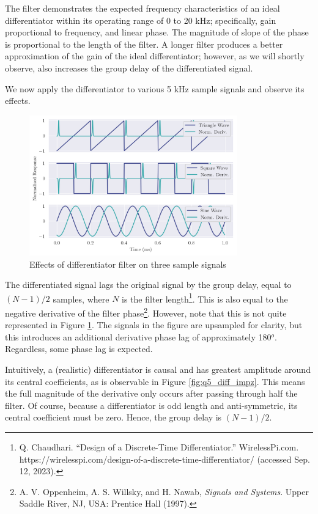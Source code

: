 The filter demonstrates the expected frequency characteristics of an ideal differentiator within its operating range of 0 to 20 kHz; specifically, gain proportional to frequency, and linear phase. The magnitude of slope of the phase is proportional to the length of the filter. A longer filter produces a better approximation of the gain of the ideal differentiator; however, as we will shortly observe, also increases the group delay of the differentiated signal.

\newpage

We now apply the differentiator to various 5 kHz sample signals and observe its effects.

\begin{figure}[!ht]
    \centering
    \includegraphics[width=0.8\textwidth]{images/q5_diff_applied.png}
    \caption{Effects of differentiator filter on three sample signals}
    \label{fig:q5_diff_applied}
\end{figure}

The differentiated signal lags the original signal by the group delay, equal to $(N-1)/2$ samples, where $N$ is the filter length\footnote{Q. Chaudhari. ``Design of a Discrete-Time Differentiator.'' WirelessPi.com. https://wirelesspi.com/design-of-a-discrete-time-differentiator/ (accessed Sep. 12, 2023).}. This is also equal to the negative derivative of the filter phase\footnote{A. V. Oppenheim, A. S. Willsky, and H. Nawab, \textit{Signals and Systems}. Upper Saddle River, NJ, USA: Prentice Hall (1997).}. However, note that this is not quite represented in Figure \ref{fig:q5_diff_applied}. The signals in the figure are upsampled for clarity, but this introduces an additional derivative phase lag of approximately 180$^o$. Regardless, some phase lag is expected.

Intuitively, a (realistic) differentiator is causal and has greatest amplitude around its central coefficients, as is observable in Figure \ref{fig:q5_diff_impz}. This means the full magnitude of the derivative only occurs after passing through half the filter. Of course, because a differentiator is odd length and anti-symmetric, its central coefficient must be zero. Hence, the group delay is $(N-1)/2$.

